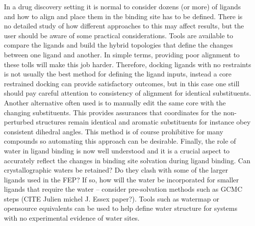 \documentclass[9pt,bestpractices]{livecoms}
\begin{document}
In a drug discovery setting it is normal to consider dozens (or more) of ligands and how to align and place them in the binding site has to be defined. There is no detailed study of how different approaches to this may affect results, but the user should be aware of some practical considerations. Tools are available to compare the ligands and build the hybrid topologies that define the changes between one ligand and another. In simple terms, providing poor alignment to these tolls will make this job harder. Therefore, docking ligands with no restraints is not usually the best method for defining the ligand inputs, instead a core restrained docking can provide satisfactory outcomes, but in this case one still should pay careful attention to consistency of alignment for identical substituents. Another alternative often used is to manually edit the same core with the changing substituents. This provides assurances that coordinates for the non-perturbed structures remain identical and aromatic substituents for instance obey consistent dihedral angles. This method is of course prohibitive for many compounds so automating this approach can be desirable. Finally, the role of water in ligand binding is now well understood and it is a crucial aspect to accurately reflect the changes in binding site solvation during ligand binding. Can crystallographic waters be retained? Do they clash with some of the larger ligands used in the FEP? If so, how will the water be incorporated for smaller ligands that require the water – consider pre-solvation methods such as GCMC steps (CITE Julien michel J. Essex paper?). Tools such as watermap or opensource equivalents can be used to help define water structure for systems with no experimental evidence of water sites.  
\end{document}
